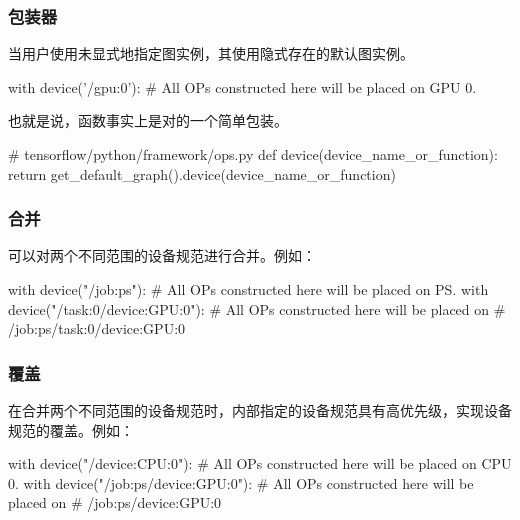 \begin{content}
\subsubsection{包装器}

当用户使用未显式地指定图实例，其使用隐式存在的默认图实例。

\begin{leftbar}
\begin{python}
with device('/gpu:0'):
  # All OPs constructed here will be placed on GPU 0.
\end{python}
\end{leftbar}

也就是说，函数事实上是对的一个简单包装。

\begin{leftbar}
\begin{python}
# tensorflow/python/framework/ops.py
def device(device_name_or_function):
  return get_default_graph().device(device_name_or_function)
\end{python}
\end{leftbar}

\subsubsection{合并}

可以对两个不同范围的设备规范进行合并。例如：

\begin{leftbar}
\begin{python}
with device("/job:ps"):
  # All OPs constructed here will be placed on PS.
  with device("/task:0/device:GPU:0"):
    # All OPs constructed here will be placed on
    # /job:ps/task:0/device:GPU:0
\end{python}
\end{leftbar}

\subsubsection{覆盖}

在合并两个不同范围的设备规范时，内部指定的设备规范具有高优先级，实现设备规范的覆盖。例如：

\begin{leftbar}
\begin{python}
with device("/device:CPU:0"):
  # All OPs constructed here will be placed on CPU 0.
  with device("/job:ps/device:GPU:0"):
    # All OPs constructed here will be placed on
    # /job:ps/device:GPU:0
\end{python}
\end{leftbar}


\end{content}
